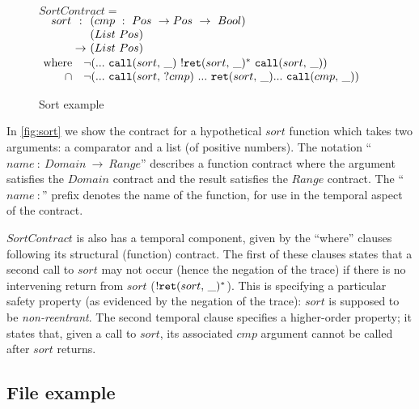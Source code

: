 \documentclass[preprint,onecolumn,9pt]{sigplanconf} %
\begin{document}
\renewcommand*{\arraystretch}{1.2}
\newcommand*{\call}[1]{\scallev{#1}{\_}}
\newcommand*{\ret}[1]{\sretev{#1}{\_}}
\begin{figure}
 $SortContract = $ \\
 $\begin{array}{ @{\quad}l@{\ } c @{\ }l }
 sort &:   &(cmp\ :\ Pos\ \to Pos\ \to\ Bool) \\
      &    &(List\ Pos) \\
      &\to &(List\ Pos) \\
 \end{array}$
 $\begin{array}{ @{~}r@{} l @{}l }
  \text{where}\quad
  &\stnot{(&\sddd~ \call{sort}~ \stmany{\snonevent{\ret{sort}}}~ \call{sort})} \\
  \cap\quad
  &\stnot{(&\sddd~ \scallev{sort}{?cmp}~ \sddd~ \ret{sort} \sddd~ \call{cmp})}
 \end{array}$
 \caption{Sort example}
 \label{fig:sort}
\end{figure}

In \autoref{fig:sort} we show the contract for a hypothetical $sort$ function which takes two arguments: a comparator and a list (of positive numbers).
%
The notation ``$\mathit{name}\ :\ Domain\ \to\ Range$'' describes a function contract where the argument satisfies the $Domain$ contract and the result satisfies the $Range$ contract.
%
The ``$\mathit{name}\ :$'' prefix denotes the name of the function, for use in the temporal aspect of the contract.

$SortContract$ is also has a temporal component, given by the ``where'' clauses following its structural (function) contract.
%
The first of these clauses states that a second call to $sort$ may not occur (hence the negation of the trace) if there is no intervening return from $sort$ ($\stmany{\snonevent{\ret{sort}}}$).
%
This is specifying a particular safety property (as evidenced by the negation of the trace): $sort$ is supposed to be \emph{non-reentrant}.
%
The second temporal clause specifies a higher-order property; it states that, given a call to $sort$, its associated $cmp$ argument cannot be called after $sort$ returns.

\subsection{File example}
\end{document}
